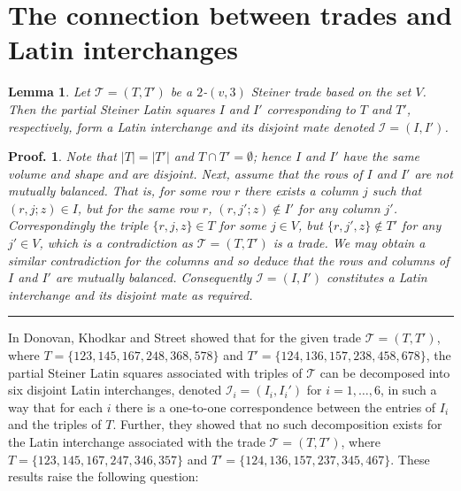\documentclass[12pt]{report}
\newtheorem{lemma}{Lemma}
\newtheorem{preproof}{{\bf Proof.}}
\newenvironment{proof}[1]{\begin{preproof}{\rm
               #1}\hfill{\rule[-0.5mm]{2mm}{2mm}}}{\end{preproof}}
\begin{document}
%

\section{The connection between trades and Latin interchanges}\label{sec71}
\begin{lemma}
Let ${\mathcal T}=(T,T')$ be a $2$-$(v,3)$ Steiner trade based on the set $V$. Then the partial Steiner  Latin 
squares $I$ and $I'$ corresponding to $T$ and $T'$, respectively, 
form a Latin interchange and its disjoint mate denoted ${\mathcal I}=(I,I')$.
\end{lemma}

\begin{proof}{
 Note that $|T|=|T'|$ and $T\cap T'=\emptyset$;
hence $I$ and $I'$ have the same volume and shape and are disjoint. 
Next, assume that the rows of $I$ and $I'$ are not mutually balanced. That is, for some row $r$ there exists a column $j$ such that $(r,j;z)\in I$, but for the same row $r$, $(r,j';z)\notin I'$ for any column $j'$. Correspondingly the triple $\{r,j,z\}\in T$  for some $j\in V$, but $\{r,j',z\}\notin T'$  for any $j'\in V$, which is a contradiction as ${\mathcal T}=(T,T')$ is a trade. We may obtain a similar contradiction for the columns and so deduce that the rows and columns of $I$ and $I'$ are mutually balanced. Consequently ${\mathcal I}=(I,I')$ constitutes a Latin interchange and its disjoint mate as required.
}
\end{proof}

In \cite{dks2} Donovan, Khodkar and Street showed that for the given 
trade ${\mathcal T}=(T,T')$, where 
$T=\{1 2 3,1 4 5,1 6 7,2 4 8,3 6 8, 5 7 8\}$ and 
$T'=\{1 2 4,1 3 6,1 5 7,2 3 8,
4 5 8,
6 7 8\}$, 
the partial Steiner Latin squares associated with 
triples of ${\mathcal T}$ can be 
decomposed into six disjoint Latin  interchanges, 
denoted ${\mathcal I}_i=(I_i,I_i')$ for $i=1,\dots, 6$, in such a way that 
for each $i$ there is a one-to-one correspondence between the 
entries of $I_i$ and the triples of $T$. 
Further, they showed that no such decomposition exists for the Latin 
interchange associated with the trade  
${\mathcal T}=(T,T')$, where 
$T=\{1 2 3,1 4 5,1 6 7,2 4 7,3 4 6,3 5 7\}$ and 
$T'=\{1 2 4,1 3 6,1 5 7,2 3 7,3 4 5,4 6 7\}$. 
These results raise the following question:
\vspace{.2cm}
\end{document}
